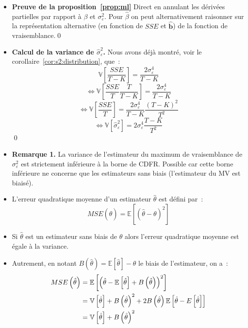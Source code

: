 \documentclass[10pt,a4paper]{article}
\theoremstyle{definition}
\renewcommand{\newline}{\unskip\par\vspace{1.5pt}}
\begin{document}
\begin{notes}

  \begin{itemize}

  \item \textbf{Preuve de la proposition~\ref{prop:ml}} Direct en annulant les dérivées partielles par rapport à $\beta$ et $\sigma_{\varepsilon}^2$. Pour $\hat\beta$ on peut alternativement raisonner sur la représentation alternative (en fonction de $SSE$ et $\hat{\mathbf b}$) de la fonction de vraisemblance.\qed\newline

  \item \textbf{Calcul de la variance de $\hat{\sigma}_{\varepsilon}^2$.} Nous avons déjà montré, voir le corollaire~\ref{cor:s2:distribution}, que~:
    \[
      \mathbb V\left[ \frac{SSE}{T-K} \right] = \frac{2\sigma_{\varepsilon}^4}{T-K}
    \]
    \[
      \Leftrightarrow \mathbb V\left[ \frac{SSE}{T}\frac{T}{T-K} \right] = \frac{2\sigma_{\varepsilon}^4}{T-K}
    \]
    \[
      \Leftrightarrow \mathbb V\left[ \frac{SSE}{T}\right] = \frac{2\sigma_{\varepsilon}^4}{T-K}\frac{(T-K)^2}{T^2}
    \]
    \[
      \Leftrightarrow \mathbb V\left[ \hat{\sigma}_{\varepsilon}^2\right] = 2\sigma_{\varepsilon}^4\frac{T-K}{T^2}
    \]
    \qed\newline

  \item \textbf{Remarque 1.} La variance de l'estimateur du maximum de vraisemblance de $\sigma_{\varepsilon}^2$ est strictement inférieure à la borne de CDFR. Possible car cette borne inférieure ne concerne que les estimateurs sans biais (l'estimateur du MV est biaisé).\newline

  \item L'erreur quadratique moyenne d'un estimateur $\hat\theta$ est défini par~:
    \[
      MSE(\hat\theta) = \mathbb E\left[ \left( \hat\theta -\theta \right)^2 \right]
    \]
  \item Si $\hat\theta$ est un estimateur sans biais de $\theta$ alors l'erreur quadratique moyenne est égale à la variance.\newline

  \item Autrement, en notant $B(\hat\theta) = \mathbb E\left[\hat\theta\right]-\theta$ le biais de l'estimateur, on a~:
    \[
      \begin{split}
        MSE\left( \hat\theta \right) &= \mathbb E \left[ \left( \hat\theta - \mathbb E\left[\hat\theta\right] + B\left( \hat\theta \right) \right)^2 \right]\\
                                     &= \mathbb V\left[ \hat\theta \right] + B\left( \hat\theta \right)^2 + 2B\left(\hat\theta\right)\mathbb E\left[ \hat\theta - \mathbb \mathbb E\left[ \hat\theta \right] \right]\\
        &= \mathbb V\left[ \hat\theta \right] + B\left( \hat\theta \right)^2
      \end{split}
    \]


\end{itemize}
\end{notes}
\end{document}
